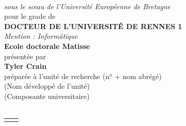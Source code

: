 \begin{titlepage}
\begin{center}
\begin{minipage}{\glarg}
\vspace{0.5cm}
\\ \vspace{0mm}\emph{\Large sous le sceau de l'Universit\'e Europ\'eenne de Bretagne}\\ \vspace{0.5cm}
{\Large pour le grade de}\\ \vspace{2mm}
{\Large\bf DOCTEUR DE L'UNIVERSIT\'E DE RENNES 1}\\ \vspace{0.4cm}
\emph{\Large Mention : Inform{\'a}tique}\\ \vspace{2mm}
{\Large\bf Ecole doctorale Matisse}\\ \vspace{0.3cm}
{\Large pr\'esent\'ee par} \\ \vspace{3mm}
{\Huge\bf Tyler Crain}\\ \vspace{0.4cm}
{\Large pr\'epar\'ee \`a l'unit\'e de recherche (n$^o$ + nom abr\'eg\'e)\\
(Nom d\'evelopp\'e de l'unit\'e)\\
(Composante universitaire)}\vspace{0.3cm}
\\
\hspace{-20mm}{\rule{\Glarg}{1pt}}\\
\vspace{8mm}

\begin{tabular}{p{7cm}p{10cm}}
\begin{minipage}{\plarg}
\hspace{-1.8cm}{\huge\bf Intitul\'e de la th\`ese:}\vspace{5mm}

\hspace{-1.8cm}{\huge\bf Software Transactional}\vspace{5mm}

\hspace{-1.8cm}{\huge\bf Memory and Concurrent}\vspace{5mm}

\hspace{-1.8cm}{\huge\bf Data Structures:}\vspace{5mm}


\end{minipage}
\end{tabular}
\end{minipage}
\end{center}
\end{titlepage}
